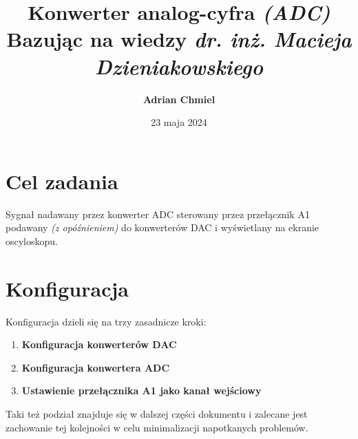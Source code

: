 \documentclass{article}
\begin{document}
\title{\textbf{Konwerter analog-cyfra \textit{(ADC)}}
\\ \large{Bazując na wiedzy \textit{dr. inż. Macieja Dzieniakowskiego}}}
\author{\textbf{Adrian Chmiel}}
\date{23 maja 2024}
\maketitle

\section{Cel zadania}
Sygnał nadawany przez konwerter ADC sterowany przez przełącznik A1 podawany \textit{(z opóźnieniem)} do konwerterów DAC i wyświetlany na ekranie oscyloskopu.

\section{Konfiguracja}
Konfiguracja dzieli się na trzy zasadnicze kroki:
\begin{enumerate}[label=\arabic*.]
    \item \textbf{Konfiguracja konwerterów DAC}
    \item \textbf{Konfiguracja konwertera ADC}
    \item \textbf{Ustawienie przełącznika A1 jako kanał wejściowy}
\end{enumerate}
Taki też podział znajduje się w dalszej części dokumentu i zalecane jest zachowanie tej kolejności w celu minimalizacji napotkanych problemów.
\end{document}

